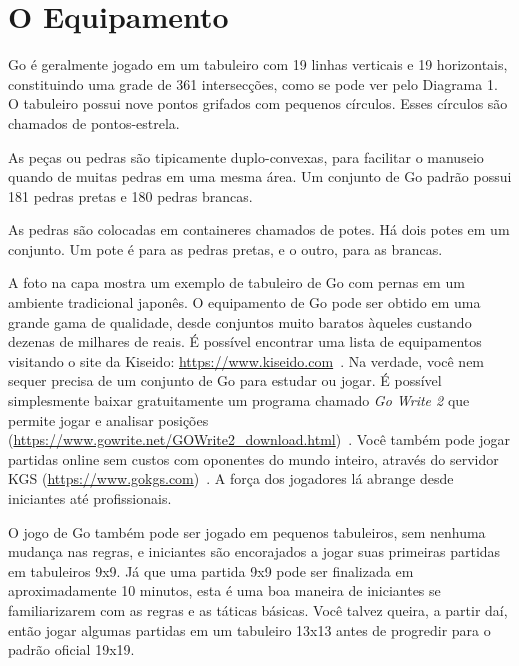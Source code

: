 \chapter{O Equipamento}

Go é geralmente jogado em um tabuleiro com 19 linhas verticais e 19 horizontais, constituindo uma grade de 361 intersecções, como se pode ver pelo Diagrama 1. O tabuleiro possui nove pontos grifados com pequenos círculos. Esses círculos são chamados de pontos-estrela.

As peças ou pedras são tipicamente duplo-convexas, para facilitar o manuseio quando de muitas pedras em uma mesma área. Um conjunto de Go padrão possui 181 pedras pretas e 180 pedras brancas.

As pedras são colocadas em containeres chamados de potes. Há dois potes em um conjunto. Um pote é para as pedras pretas, e o outro, para as brancas.

A foto na capa mostra um exemplo de tabuleiro de Go com pernas em um ambiente tradicional japonês. O equipamento de Go pode ser obtido em uma grande gama de qualidade, desde conjuntos muito baratos àqueles custando dezenas de milhares de reais. É possível encontrar uma lista de equipamentos visitando o site da Kiseido: \url{https://www.kiseido.com}~\cite{kiseido}. Na verdade, você nem sequer precisa de um conjunto de Go para estudar ou jogar. É possível simplesmente baixar gratuitamente um programa chamado \emph{Go Write 2} que permite jogar e analisar posições (\url{https://www.gowrite.net/GOWrite2_download.html})~\cite{gowrite}. Você também pode jogar partidas online sem custos com oponentes do mundo inteiro, através do servidor KGS (\url{https://www.gokgs.com})~\cite{kgs}. A força dos jogadores lá abrange desde iniciantes até profissionais.

O jogo de Go também pode ser jogado em pequenos tabuleiros, sem nenhuma mudança nas regras, e iniciantes são encorajados a jogar suas primeiras partidas em tabuleiros 9x9. Já que uma partida 9x9 pode ser finalizada em aproximadamente 10 minutos, esta é uma boa maneira de iniciantes se familiarizarem com as regras e as táticas básicas. Você talvez queira, a partir daí, então jogar algumas partidas em um tabuleiro 13x13 antes de progredir para o padrão oficial 19x19.